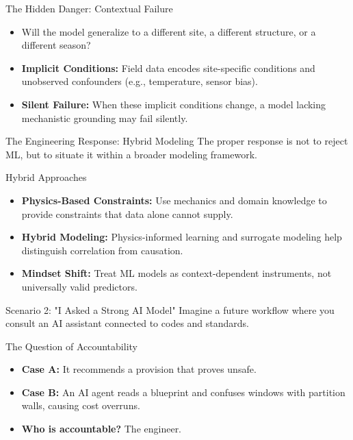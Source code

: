 \documentclass[german,10pt]{beamer}
\begin{document}
\begin{frame}{The Hidden Danger: Contextual Failure}
    \justifying
    \begin{itemize}
        \item Will the model generalize to a different site, a different structure, or a different season?
        \item \textbf{Implicit Conditions:} Field data encodes site-specific conditions and unobserved confounders (e.g., temperature, sensor bias).
        \item \textbf{Silent Failure:} When these implicit conditions change, a model lacking mechanistic grounding may fail silently.
    \end{itemize}
\end{frame}



\begin{frame}{The Engineering Response: Hybrid Modeling}
    \justifying
    The proper response is not to reject ML, but to situate it within a broader modeling framework.
    \begin{conceptbox}{Hybrid Approaches}
    \begin{itemize}
        \item \textbf{Physics-Based Constraints:} Use mechanics and domain knowledge to provide constraints that data alone cannot supply.
        \item \textbf{Hybrid Modeling:} Physics-informed learning and surrogate modeling help distinguish correlation from causation.
        \item \textbf{Mindset Shift:} Treat ML models as context-dependent instruments, not universally valid predictors.
    \end{itemize}
    \end{conceptbox}
\end{frame}

\begin{frame}{Scenario 2: "I Asked a Strong AI Model"}
    \justifying
    Imagine a future workflow where you consult an AI assistant connected to codes and standards.
    \begin{examplebox}{The Question of Accountability}
    \begin{itemize}
        \item \textbf{Case A:} It recommends a provision that proves unsafe.
        \item \textbf{Case B:} An AI agent reads a blueprint and confuses windows with partition walls, causing cost overruns.
        \item \textbf{Who is accountable?} The engineer.
    \end{itemize}
    \end{examplebox}
\end{frame}
\end{document}
